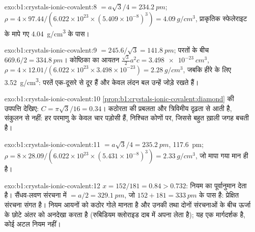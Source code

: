 \begin{solution}{exo:b1:crystals-ionic-covalent:8}
 $= a\sqrt3/4 = \qty{234.2}{pm}$;
$\rho = 4 \times 97.44/(6.022 \times 10^{23} \times (5.409 \times
10^{-8})^3) = \qty{4.09}{g/cm^3}$, प्राकृतिक स्फेलेराइट के मापे गए
\qty{4.04}{g/cm^3} के पास।
\end{solution}

\begin{solution}{exo:b1:crystals-ionic-covalent:9}
 $= 245.6/\sqrt3 = \qty{141.8}{pm}$; परतों के बीच $669.6/2 =
\qty{334.8}{pm}$। कोष्ठिका का आयतन $\frac{\sqrt3}{2}a^2c = \qty{3.498e-23}{cm^3}$,
$\rho = 4 \times 12.01/(6.022 \times 10^{23} \times 3.498 \times 10^{-23})
= \qty{2.28}{g/cm^3}$, जबकि हीरे के लिए \qty{3.52}{g/cm^3}: परतें
एक-दूसरे से दूर हैं और केवल लंदन बल उन्हें जोड़े रखते हैं।
\end{solution}

\begin{solution}{exo:b1:crystals-ionic-covalent:10}
\cref{prop:b1:crystals-ionic-covalent:diamond} की उपपत्ति देखिए:
$C = \pi\sqrt3/16 = 0.34$। कठोरता  की प्रबलता और
त्रिविमीय दृढ़ता से आती है, संकुलन से नहीं: हर
परमाणु के केवल चार पड़ोसी हैं, निश्चित कोणों पर, जिससे बहुत ख़ाली
जगह बचती है।
\end{solution}

\begin{solution}{exo:b1:crystals-ionic-covalent:11}
 $= a\sqrt3/4 = \qty{235.2}{pm}$, 
\qty{117.6}{pm}; $\rho = 8 \times 28.09/(6.022 \times 10^{23} \times
(5.431 \times 10^{-8})^3) = \qty{2.33}{g/cm^3}$, जो मापा गया मान ही है।
\end{solution}

\begin{solution}{exo:b1:crystals-ionic-covalent:12}
$x = 152/181 = 0.84 > 0.732$: नियम  का पूर्वानुमान देता है।
सैंधव-लवण संरचना में  $= a/2 = \qty{329.1}{pm}$, जो
$152 + 181 = \qty{333}{pm}$ के पास है: प्रेक्षित संरचना संगत है।
नियम आयनों को कठोर गोले मानता है और उनकी  तथा दोनों संरचनाओं के बीच
ऊर्जा के छोटे अंतर को अनदेखा करता है (रुबिडियम
क्लोराइड दाब में  अपना लेता है); यह एक मार्गदर्शक है,
कोई अटल नियम नहीं।
\end{solution}

